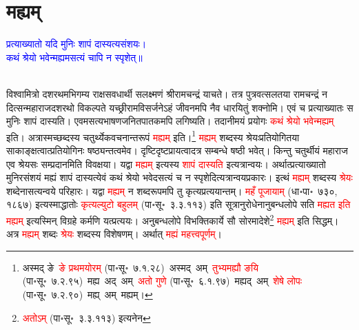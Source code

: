 \section[मह्यम्]{मह्यम्‌}
\centering\textcolor{blue}{प्रत्याख्यातो यदि मुनिः शापं दास्यत्यसंशयः।\nopagebreak\\
कथं श्रेयो भवेन्मह्यमसत्यं चापि न स्पृशेत्॥}\nopagebreak\\
\\
\begin{sloppypar}\justifying\noindent\hspace{10mm} विश्वामित्रो दशरथमभिगम्य राक्षस\-वधार्थी सलक्ष्मणं श्रीरामचन्द्रं याचते। तत्र पुत्र\-वत्सलतया रामचन्द्रं न दित्सन्महाराज\-दशरथो विकल्पते यच्छ्रीराम\-विसर्जनेऽहं जीवनमपि नैव धारयितुं शक्नोमि। एवं च प्रत्याख्यातः स मुनिः शापं दास्यति। एवमसत्य\-भाषण\-जनित\-पातकमपि लगिष्यति। तदानीमयं प्रयोगः \textcolor{red}{कथं श्रेयो भवेन्मह्यम्‌} इति।
अत्रास्मच्छब्दस्य चतुर्थ्येक\-वचनान्त\-रूपं \textcolor{red}{मह्यम्‌} इति।\footnote{अस्मद् ङे~\arrow \textcolor{red}{ङे प्रथमयोरम्‌} (पा॰सू॰~७.१.२८)~\arrow अस्मद्~अम्~\arrow \textcolor{red}{तुभ्यमह्यौ ङयि} (पा॰सू॰~७.२.९५)~\arrow मह्य~अद्~अम्~\arrow \textcolor{red}{अतो गुणे} (पा॰सू॰~६.१.९७)~\arrow मह्यद्~अम्~\arrow \textcolor{red}{शेषे लोपः} (पा॰सू॰~७.२.९०)~\arrow मह्य्~अम्~\arrow मह्यम्।} \textcolor{red}{मह्यम्‌} शब्दस्य श्रेयः\-प्रतियोगितया साकाङ्क्षत्वात्प्रतियोगिनः षष्ठ्यन्तत्वमेव। दृष्टि\-दृष्ट\-प्रायत्वादत्र सम्बन्धे षष्ठी भवेत्। किन्तु चतुर्थीयं महाराज एव श्रेयसः सम्प्रदानमिति विवक्षया। यद्वा \textcolor{red}{मह्यम्‌} इत्यस्य \textcolor{red}{शापं दास्यति} इत्यत्रान्वयः। अर्थात्प्रत्याख्यातो मुनिरसंशयं मह्यं शापं दास्यत्येवं कथं श्रेयो भवेदसत्यं च न स्पृशेदित्यत्रान्वय\-प्रकारः। इत्थं \textcolor{red}{मह्यम्‌} शब्दस्य \textcolor{red}{श्रेयः} शब्देनासत्यन्वये परिहारः। यद्वा \textcolor{red}{मह्यम्‌} न शब्द\-रूपमपि तु कृत्य\-प्रत्ययान्तम्। \textcolor{red}{महँ पूजायाम्‌} (धा॰पा॰~७३०, १८६७) इत्यस्माद्धातोः \textcolor{red}{कृत्य\-ल्युटो बहुलम्‌} (पा॰सू॰~३.३.११३) इति सूत्रानुरोधेनानुबन्ध\-लोपे सति \textcolor{red}{मह्यत इति मह्यम्‌} इत्यस्मिन् विग्रहे
कर्मणि यत्प्रत्ययः। अनुबन्ध\-लोपे विभक्ति\-कार्ये सौ सोरमादेशे\footnote{\textcolor{red}{अतोऽम्‌} (पा॰सू॰~३.३.११३) इत्यनेन} \textcolor{red}{मह्यम्‌} इति सिद्धम्। अत्र \textcolor{red}{मह्यम्‌} शब्दः \textcolor{red}{श्रेयः} शब्दस्य विशेषणम्। अर्थात् \textcolor{red}{मह्यं महत्त्व\-पूर्णम्‌}।\end{sloppypar}
